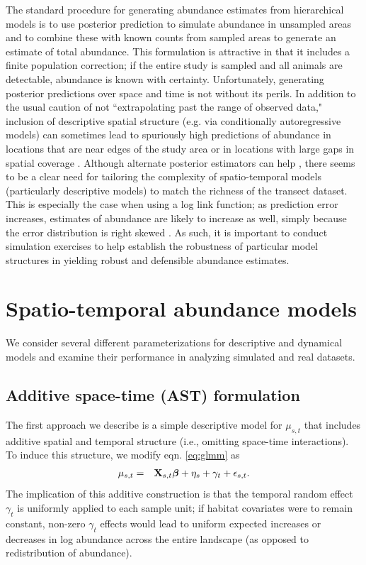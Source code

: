 \documentclass[times,mee,doublespace,]{besauth2}
\begin{document}
The standard procedure for generating abundance estimates from hierarchical models is to use posterior prediction to simulate abundance in unsampled areas and to combine these with known counts from sampled areas \citep{VerHoef2008,JohnsonEtAl2010} to generate an estimate of total abundance.  This formulation is attractive in that it includes a finite population correction; if the entire study is sampled and all animals are detectable, abundance is known with certainty.  Unfortunately, generating posterior predictions over space and time is not without its perils.  In addition to the usual caution of not ``extrapolating past the range of observed data," inclusion of descriptive spatial structure (e.g. via conditionally autoregressive models) can sometimes lead to spuriously high predictions of abundance in locations that are near edges of the study area \citep[edge effects;][]{VerHoefJansen2007} or in locations with large gaps in spatial coverage \citep{ConnEtAl2014}.  Although alternate posterior estimators can help \citep[e.g. the Varian predictor induced by the linex loss function][]{VerHoefJansen2007}, there seems to be a clear need for tailoring the complexity of spatio-temporal models (particularly descriptive models) to match the richness of the transect dataset.  This is especially the case when using a log link function; as prediction error increases, estimates of abundance are likely to increase as well, simply because the error distribution is right skewed \citep{VerHoef2008}.  As such, it is important to conduct simulation exercises to help establish the robustness of particular model structures in yielding robust and defensible abundance estimates.

\section{Spatio-temporal abundance models}

We consider several different parameterizations for descriptive and dynamical models and examine their performance
in analyzing simulated and real datasets.

\subsection{Additive space-time (AST) formulation}

The first approach we describe is a simple descriptive model for $\mu_{s,t}$ that includes additive spatial and
temporal structure (i.e., omitting space-time interactions).  To induce this structure, we modify eqn. \ref{eq:glmm} as
\begin{eqnarray*}
  \mu_{s,t} & = & {\bf X}_{s,t} \boldsymbol{\beta} + \eta_s + \gamma_t + \epsilon_{s,t}.
\end{eqnarray*}
The implication of this additive construction is that the temporal random effect $\gamma_t$ is uniformly applied to each sample unit; if habitat covariates were to remain constant, non-zero $\gamma_t$ effects would lead to uniform expected increases or decreases in log abundance across the entire landscape (as opposed to redistribution of abundance).
\end{document}
